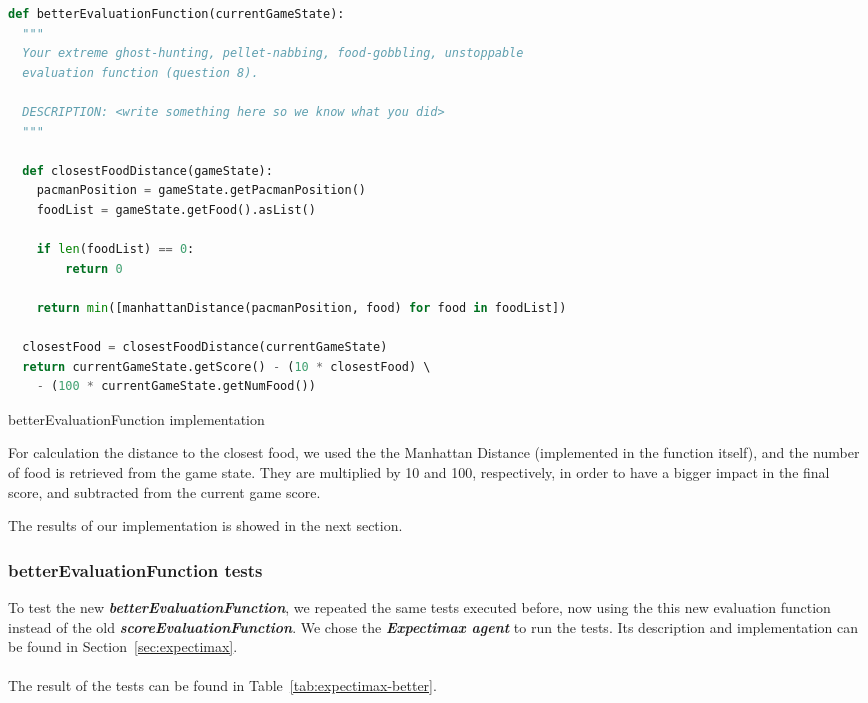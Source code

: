 \documentclass{article}
\begin{document}
\begin{table}[!ht]
  \begin{lstlisting}[language=python, frame=tlbr, framesep=6pt, backgroundcolor=\color{light-gray}]
def betterEvaluationFunction(currentGameState):
  """
  Your extreme ghost-hunting, pellet-nabbing, food-gobbling, unstoppable
  evaluation function (question 8).

  DESCRIPTION: <write something here so we know what you did>
  """
  
  def closestFoodDistance(gameState):
    pacmanPosition = gameState.getPacmanPosition()
    foodList = gameState.getFood().asList()

    if len(foodList) == 0:
        return 0

    return min([manhattanDistance(pacmanPosition, food) for food in foodList])

  closestFood = closestFoodDistance(currentGameState)
  return currentGameState.getScore() - (10 * closestFood) \ 
    - (100 * currentGameState.getNumFood())
  \end{lstlisting}
  \caption{betterEvaluationFunction implementation}
\end{table}

For calculation the distance to the closest food, we used the the Manhattan Distance (implemented in the function itself), and the number of food is retrieved from the game state. They are multiplied by 10 and 100, respectively, in order to have a bigger impact in the final score, and subtracted from the current game score.

The results of our implementation is showed in the next section.

\subsubsection{betterEvaluationFunction tests}

To test the new \textit\textbf{{betterEvaluationFunction}}, we repeated the same tests executed before, now using the this new evaluation function instead of the old \textit\textbf{{scoreEvaluationFunction}}. We chose the  \textit\textbf{{Expectimax agent}} to run the tests. Its description and implementation can be found in Section~\ref{sec:expectimax}.
~\\
~\\
The result of the tests can be found in Table~\ref{tab:expectimax-better}.
\end{document}
